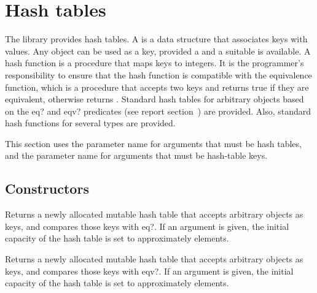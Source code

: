 \chapter{Hash tables}
\label{hashtablechapter}

The  library provides hash tables.
A  is a data structure that associates keys with values.
Any object can be used as a key, provided a 
and a suitable  is available.  A hash function is a
procedure that maps
keys to integers.
It is the programmer's responsibility to ensure that the hash function
is compatible with the equivalence function,
which is a procedure that accepts two keys and returns true if they
are equivalent, otherwise returns \schfalse{}.
Standard hash tables for arbitrary objects based on the {\cf eq?} and 
{\cf eqv?} predicates (see report section~) are provided.  
Also, standard hash functions for several types are provided.

This section uses the  parameter name for arguments
that must be hash tables, and the  parameter name for
arguments that must be hash-table keys.

\section{Constructors}


\begin{entry}{%
}

Returns a newly allocated mutable hash table that accepts
arbitrary objects as keys,
and compares those keys with {\cf eq?}. If an argument is given, the initial 
capacity of the hash table is set to approximately  elements.

\end{entry}

\begin{entry}{%
}

Returns a newly allocated mutable hash table that accepts
arbitrary objects as keys,
and compares those keys with {\cf eqv?}.
If an argument is given, the initial 
capacity of the hash table is set to approximately  elements.

\end{entry}

